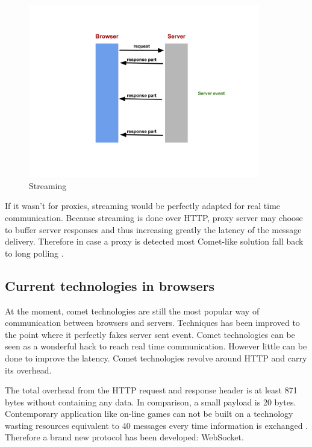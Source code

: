 \begin{figure}[H]
\centering
\includegraphics[width=0.9\textwidth]{./Figures/streaming.png}
\caption[Streaming]{Streaming}
\label{fig:streaming}
\end{figure}

If it wasn't for proxies, streaming would be perfectly adapted for real time
communication. Because streaming is done over HTTP, proxy server may choose to
buffer server responses and thus increasing greatly the latency of the message
delivery. Therefore in case a proxy is detected most Comet-like solution fall
back to long polling \citep{Reference2}.

\subsection{Current technologies in browsers}

At the moment, comet technologies are still the most popular way of
communication between browsers and servers. Techniques has been improved to
the point where it perfectly fakes server sent event. Comet technologies can be
seen as a wonderful hack to reach real time communication. However little can
be done to improve the latency. Comet technologies revolve around HTTP and
carry its overhead.

The total overhead from the HTTP request and response header is at least 871
bytes without containing any data. In comparison, a small payload is 20 bytes.
Contemporary application like on-line games can not be built on a technology
wasting resources equivalent to 40 messages every time information is 
exchanged \citep{Reference2}. Therefore a brand new protocol has been
developed: WebSocket.

